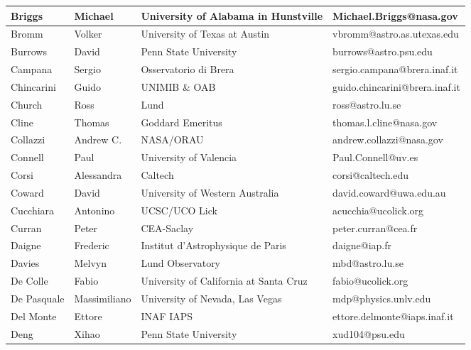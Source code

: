 \begin{center}
\begin{longtable}{|p{1.28cm} |p{1.28cm} |p{2.9cm} |p{3cm} |}
\tiny Briggs &\tiny Michael & \tiny University of Alabama in Hunstville & \tiny Michael.Briggs@nasa.gov \\ \hline
\tiny Bromm &\tiny Volker & \tiny University of Texas at Austin & \tiny vbromm@astro.as.utexas.edu \\ \hline
\tiny Burrows &\tiny David & \tiny Penn State University & \tiny burrows@astro.psu.edu \\ \hline
\tiny Campana &\tiny Sergio & \tiny Osservatorio di Brera & \tiny sergio.campana@brera.inaf.it \\ \hline
\tiny Chincarini &\tiny Guido & \tiny UNIMIB \& OAB & \tiny guido.chincarini@brera.inaf.it \\ \hline
\tiny Church &\tiny Ross & \tiny Lund & \tiny ross@astro.lu.se \\ \hline
\tiny Cline &\tiny Thomas & \tiny Goddard Emeritus & \tiny thomas.l.cline@nasa.gov \\ \hline
\tiny Collazzi &\tiny Andrew C. & \tiny NASA/ORAU & \tiny andrew.collazzi@nasa.gov \\ \hline
\tiny Connell &\tiny Paul & \tiny University of Valencia & \tiny Paul.Connell@uv.es \\ \hline
\tiny Corsi &\tiny Alessandra & \tiny Caltech & \tiny corsi@caltech.edu \\ \hline
\tiny Coward &\tiny David & \tiny University of Western Australia & \tiny david.coward@uwa.edu.au \\ \hline
\tiny Cucchiara &\tiny Antonino & \tiny UCSC/UCO Lick & \tiny acucchia@ucolick.org \\ \hline
\tiny Curran &\tiny Peter & \tiny CEA-Saclay & \tiny peter.curran@cea.fr \\ \hline
\tiny Daigne &\tiny Frederic & \tiny Institut d'Astrophysique de Paris & \tiny daigne@iap.fr \\ \hline
\tiny Davies &\tiny Melvyn & \tiny Lund Observatory & \tiny mbd@astro.lu.se \\ \hline
\tiny De Colle &\tiny Fabio & \tiny University of California at Santa Cruz & \tiny fabio@ucolick.org \\ \hline
\tiny De Pasquale &\tiny Massimiliano & \tiny University of Nevada, Las Vegas & \tiny mdp@physics.unlv.edu \\ \hline
\tiny Del Monte &\tiny Ettore & \tiny INAF IAPS & \tiny ettore.delmonte@iaps.inaf.it \\ \hline
\tiny Deng &\tiny Xihao & \tiny Penn State University & \tiny xud104@psu.edu \\ \hline

\end{longtable}
\end{center}
